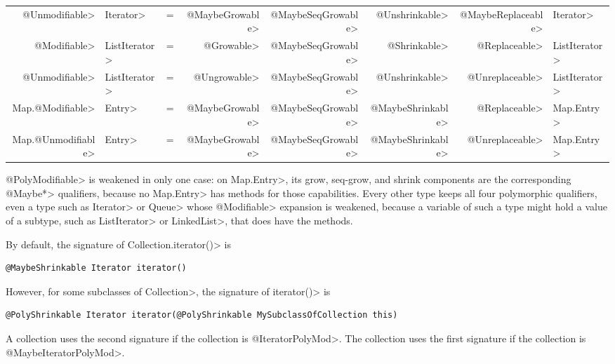 \begin{smaller}
\begin{tabular}{rlcrrrrl}
\<@Unmodifiable> & \<Iterator> & = & \<@MaybeGrowable> & \<@MaybeSeqGrowable> & \<@Unshrinkable> & \<@MaybeReplaceable> & \<Iterator> \\
\<@Modifiable> & \<ListIterator> & = & \<@Growable> & \<@MaybeSeqGrowable> & \<@Shrinkable> & \<@Replaceable> & \<ListIterator> \\
\<@Unmodifiable> & \<ListIterator> & = & \<@Ungrowable> & \<@MaybeSeqGrowable> & \<@Unshrinkable> & \<@Unreplaceable> & \<ListIterator> \\
\<Map.@Modifiable> & \<Entry> & = & \<@MaybeGrowable> & \<@MaybeSeqGrowable> & \<@MaybeShrinkable> & \<@Replaceable> & \<Map.Entry> \\
\<Map.@Unmodifiable> & \<Entry> & = & \<@MaybeGrowable> & \<@MaybeSeqGrowable> & \<@MaybeShrinkable> & \<@Unreplaceable> & \<Map.Entry> \\
\end{tabular}
\end{smaller}



\<@PolyModifiable> is weakened in only one case: on \<Map.Entry>, its grow,
seq-grow, and shrink components are the corresponding \<@Maybe*> qualifiers,
because no \<Map.Entry> has methods for those capabilities.  Every other type
keeps all four polymorphic qualifiers, even a type such as \<Iterator> or
\<Queue> whose \<@Modifiable> expansion is weakened, because a variable of
such a type might hold a value of a subtype, such as \<ListIterator> or
\<LinkedList>, that does have the methods.



By default, the signature of \<Collection.iterator()> is

\begin{Verbatim}
@MaybeShrinkable Iterator iterator()
\end{Verbatim}

However, for some subclasses of \<Collection>, the signature of
\<iterator()> is

\begin{Verbatim}
@PolyShrinkable Iterator iterator(@PolyShrinkable MySubclassOfCollection this)
\end{Verbatim}

A collection uses the second signature if the collection is
\<@IteratorPolyMod>.  The collection uses the first signature if the
collection is \<@MaybeIteratorPolyMod>.

